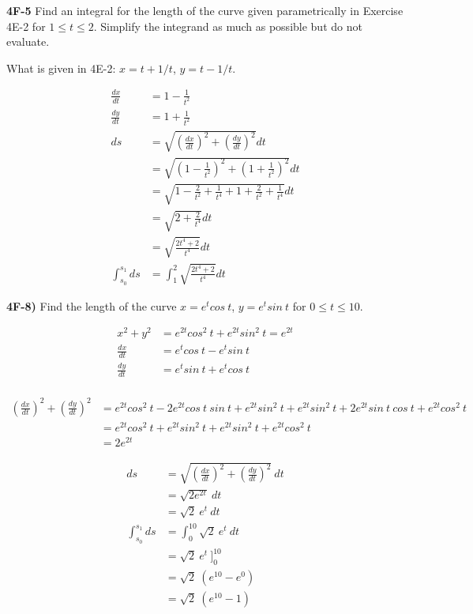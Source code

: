 \documentclass[9pt]{article}
\begin{document}
\begin{tcolorbox}
  \textbf{4F-5} Find an integral for the length of the curve given parametrically in Exercise 4E-2 for $1 \leq t \leq 2$. Simplify the integrand as much as possible but do not evaluate.
\end{tcolorbox}

What is given in 4E-2: $x = t + 1 / t$, $y = t - 1 / t$.

\begin{align*}
  \frac{dx}{dt} &= 1 - \frac{1}{t^2} \\
  \frac{dy}{dt} &= 1 + \frac{1}{t^2} \\
  ds &= \sqrt{(\frac{dx}{dt})^2 + (\frac{dy}{dt})^2} dt \\
  &= \sqrt{(1 - \frac{1}{t^2})^2 + (1 + \frac{1}{t^2})^2} dt \\
  &= \sqrt{1 - \frac{2}{t^2} + \frac{1}{t^4} + 1 + \frac{2}{t^2} + \frac{1}{t^4}} dt \\
  &= \sqrt{2 + \frac{2}{t^4}} dt \\
  &= \sqrt{\frac{2t^4 + 2}{t^4}} dt \\
  \int_{s_0}^{s_1} ds &= \int_{1}^{2} \sqrt{\frac{2t^4 + 2}{t^4}} dt
\end{align*}


\begin{tcolorbox}
  \textbf{4F-8)} Find the length of the curve $x = e^t cos\ t$, $y = e^t sin\ t$ for $0 \leq t \leq 10$.
\end{tcolorbox}

\begin{align*}
  x^2 + y^2 &= e^{2t} cos^2\ t + e^{2t} sin^2\ t = e^{2t} \\
  \frac{dx}{dt} &= e^t cos\ t - e^t sin\ t \\
  \frac{dy}{dt} &= e^t sin\ t + e^t cos\ t \\
\end{align*}

\begin{align*}
  (\frac{dx}{dt})^2 + (\frac{dy}{dt})^2 &= e^{2t} cos^2\ t - 2e^{2t} cos\ t\ sin\ t + e^{2t}sin^2\ t + e^{2t}sin^2\ t + 2e^{2t}sin\ t\ cos\ t + e^{2t}cos^2\ t \\
  &= e^{2t} cos^2\ t + e^{2t}sin^2\ t + e^{2t}sin^2\ t + e^{2t}cos^2\ t \\
  &= 2 e^{2t}
\end{align*}

\begin{align*}
  ds &= \sqrt{(\frac{dx}{dt})^2 + (\frac{dy}{dt})^2}\ dt \\
  &= \sqrt{2e^{2t}}\ dt \\
  &= \sqrt{2}\ e^{t}\ dt \\
  \int_{s_0}^{s_1} ds &= \int_{0}^{10} \sqrt{2}\ e^t\ dt \\
  &= \sqrt{2}\ e^t\ \bigg]_{0}^{10} \\
  &= \sqrt{2}\ (e^{10} - e^{0}) \\
  &= \sqrt{2}\ (e^{10} - 1)
\end{align*}
\end{document}
